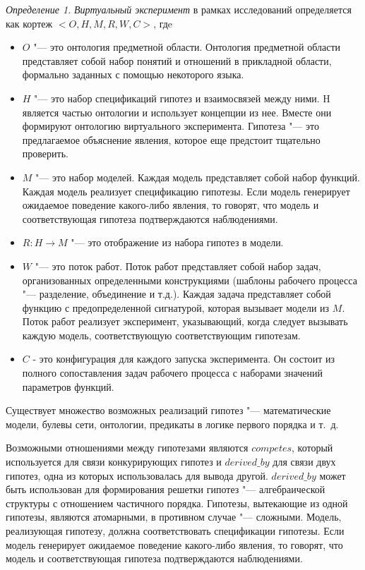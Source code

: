 \textit{Определение 1.} \textit{Виртуальный эксперимент} в рамках исследований определяется как 
кортеж $<O, H, M, R, W, C>$, гдe
\begin{itemize}
    \item $O$ "--- это онтология предметной области. Онтология предметной области представляет собой набор понятий и 
            отношений в прикладной области, формально заданных с помощью некоторого языка.
    \item $H$ "--- это набор спецификаций гипотез и взаимосвязей между ними. H является частью онтологии и использует 
            концепции из нее. Вместе они формируют онтологию виртуального эксперимента. Гипотеза "--- это предлагаемое 
            объяснение явления, которое еще предстоит тщательно проверить. 
    \item $M$ "--- это набор моделей. Каждая модель представляет собой набор функций. Каждая модель реализует 
            спецификацию гипотезы. Если модель генерирует ожидаемое поведение какого-либо явления, то говорят, что 
            модель и соответствующая гипотеза подтверждаются наблюдениями.
    \item $R: H \to M$ "--- это отображение из набора гипотез в модели.
    \item $W$ "--- это поток работ. Поток работ представляет собой набор задач, организованных определенными 
            конструкциями (шаблоны рабочего процесса "--- разделение, объединение и т.д.). Каждая задача представляет 
            собой функцию с предопределенной сигнатурой, которая вызывает модели из $M$. Поток работ реализует 
            эксперимент, указывающий, когда следует вызывать каждую модель, соответствующую соответствующим гипотезам. 
    \item $C$ - это конфигурация для каждого запуска эксперимента. Он состоит из полного сопоставления задач 
            рабочего процесса с наборами значений параметров функций.
\end{itemize}

Существует множество возможных реализаций гипотез "--- математические модели, булевы сети, онтологии, предикаты в 
логике первого порядка и т.~д.

Возможными отношениями между гипотезами являются $competes$, который используется для связи конкурирующих гипотез 
и $derived\_by$ для связи двух гипотез, одна из которых использовалась для вывода другой. $derived\_by$ может быть 
использован для формирования решетки гипотез "--- алгебраической структуры с отношением частичного порядка. 
Гипотезы, вытекающие из одной гипотезы, являются атомарными, в противном случае "--- сложными. 
Модель, реализующая гипотезу, должна соответствовать спецификации гипотезы. Если модель генерирует ожидаемое поведение 
какого-либо явления, то говорят, что модель и соответствующая гипотеза подтверждаются наблюдениями.

